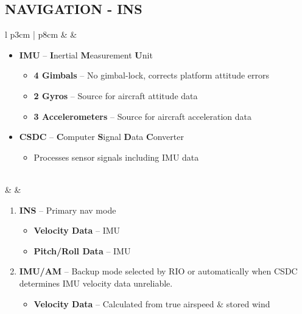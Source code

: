 \documentclass[8pt,usenames,dvipsnames,twoside]{article}
\begin{document}
	\subsection{NAVIGATION - INS}
	\begin{center}
		\begin{longtable}{l p{3cm} | p{8cm}}
			\toprule
			\textbullet &  &
			\begin{minipage}[t]{\linewidth}
				\vspace{-7pt}
				\begin{itemize}
					\item \textbf{IMU} -- \textbf{I}nertial \textbf{M}easurement \textbf{U}nit
					\begin{itemize}
						\item \textbf{4 Gimbals} -- No gimbal-lock, corrects platform attitude errors
						\item \textbf{2 Gyros} -- Source for aircraft attitude data
						\item \textbf{3 Accelerometers} -- Source for aircraft acceleration data
					\end{itemize}
					\item \textbf{CSDC} -- \textbf{C}omputer \textbf{S}ignal \textbf{D}ata \textbf{C}onverter
					\begin{itemize}
						\item Processes sensor signals including IMU data
					\end{itemize}
				\end{itemize}
			\end{minipage} \\
			\midrule
			\textbullet &  &
			\begin{minipage}[t]{\linewidth}
				\vspace{-7pt}
				\begin{enumerate}
					\item \textbf{INS} -- Primary nav mode
					\begin{itemize}
						\item \textbf{Velocity Data} -- IMU
						\item \textbf{Pitch/Roll Data} -- IMU
					\end{itemize}
					\item \textbf{IMU/AM} -- Backup mode selected by RIO or automatically when CSDC determines IMU velocity data unreliable.
					\begin{itemize}
						\item \textbf{Velocity Data} -- Calculated from true airspeed \&  stored wind

\end{itemize}
\end{enumerate}
\end{minipage}
\end{longtable}
\end{center}
\end{document}
